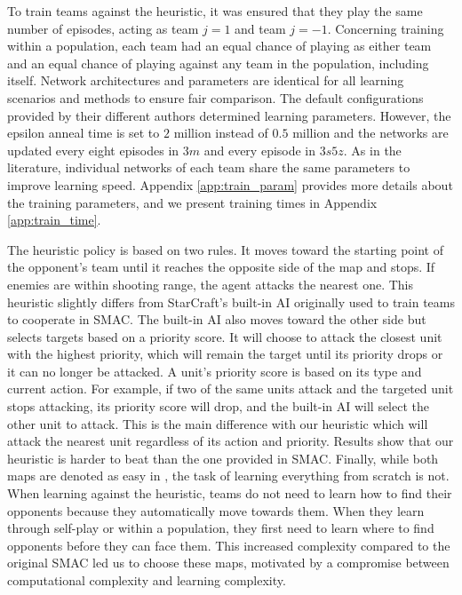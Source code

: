 To train teams against the heuristic, it was ensured that they play the same number of episodes, acting as team $j=1$ and team $j=-1$.
Concerning training within a population, each team had an equal chance of playing as either team and an equal chance of playing against any team in the population, including itself.
Network architectures and parameters are identical for all learning scenarios and methods to ensure fair comparison.
The default configurations provided by their different authors \citep{Rashid2018,Mahajan2019MAVEN:Exploration,leroy2020qvmix} determined learning parameters.
However, the epsilon anneal time is set to $2$ million instead of $0.5$ million and the networks are updated every eight episodes in $3m$ and every episode in $3s5z$.
As in the literature, individual networks of each team share the same parameters to improve learning speed. 
Appendix \ref{app:train_param} provides more details about the training parameters, and we present training times in Appendix \ref{app:train_time}.

The heuristic policy is based on two rules.
It moves toward the starting point of the opponent's team until it reaches the opposite side of the map and stops.
If enemies are within shooting range, the agent attacks the nearest one.
This heuristic slightly differs from StarCraft's built-in AI originally used to train teams to cooperate in SMAC.
The built-in AI also moves toward the other side but selects targets based on a priority score.
It will choose to attack the closest unit with the highest priority, which will remain the target until its priority drops or it can no longer be attacked.
A unit's priority score is based on its type and current action.
For example, if two of the same units attack and the targeted unit stops attacking, its priority score will drop, and the built-in AI will select the other unit to attack.
This is the main difference with our heuristic which will attack the nearest unit regardless of its action and priority.
Results show that our heuristic is harder to beat than the one provided in SMAC.
Finally, while both maps are denoted as easy in \citep{samvelyan2019starcraft}, the task of learning everything from scratch is not.
When learning against the heuristic, teams do not need to learn how to find their opponents because they automatically move towards them.
When they learn through self-play or within a population, they first need to learn where to find opponents before they can face them.
This increased complexity compared to the original SMAC led us to choose these maps, motivated by a compromise between computational complexity and learning complexity.

